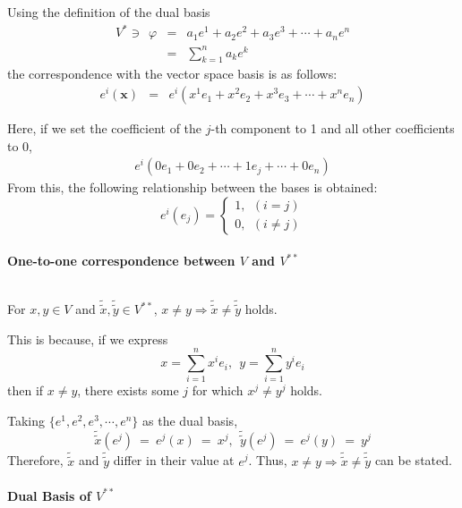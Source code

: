 \documentclass[uplatex,a4j,12pt,dvipdfmx]{jsarticle}
\begin{document}
Using the definition of the dual basis
\[
	\begin{array}{rcl}
		V^{*} \ni \ \ \varphi
		 & = &
		a_{1} e^{1} + a_{2} e^{2} + a_{3} e^{3} + \cdots + a_{n} e^{n}
		\\
		 & = &
		\displaystyle \sum_{k=1}^{n} a_{k} e^{k}
	\end{array}
\]
the correspondence with the vector space basis is as follows:
\[
	\begin{array}{rcl}
		e^{i}(\mathbf{x})
		 & = &
		e^{i} (x^{1} e_{1} + x^{2} e_{2} + x^{3} e_{3} + \cdots + x^{n} e_{n})
	\end{array}
\]

Here, if we set the coefficient of the $j$-th component to 1 and all other coefficients to 0,
\[
	\begin{array}{rcl}
		e^{i} (0 e_{1} + 0 e_{2}  + \cdots + 1 e_{j} + \cdots + 0 e_{n})
	\end{array}
\]
From this, the following relationship between the bases is obtained:
\[
	e^{i}(e_{j})
	=
	\left\{
	\begin{array}{l}
		1, \ \ (i=j) \\
		0, \ \ (i \neq j)
	\end{array}
	\right.
\]

\paragraph{One-to-one correspondence between $V$ and $V^{**}$}

${}$

For $x,y \in V$ and $\tilde{\tilde{x}}, \tilde{\tilde{y}} \in V^{**}$,
$x \neq y \Rightarrow \tilde{\tilde{x}} \neq \tilde{\tilde{y}}$ holds.

This is because,
if we express
$$
	x = \sum_{i=1}^{n} x^{i} e_{i} , \ \
	y = \sum_{i=1}^{n} y^{i} e_{i}
$$
then if $x \neq y$, there exists some $j$ for which
$x^{j} \neq y^{j}$ holds.

Taking
$\{ e^{1}, e^{2}, e^{3}, \cdots , e^{n} \}$
as the dual basis,
$$
	\tilde{\tilde{x}}(e^{j})
	\ = \
	e^{j}(x)
	\ = \
	x^{j}
	, \ \
	\tilde{\tilde{y}}(e^{j})
	\ = \
	e^{j}(y)
	\ = \
	y^{j}
$$
Therefore,
$\tilde{\tilde{x}}$ and $\tilde{\tilde{y}}$ differ in their value at $e^{j}$.
Thus,
$x \neq y \Rightarrow \tilde{\tilde{x}} \neq \tilde{\tilde{y}}$
can be stated.

\paragraph{Dual Basis of $V^{**}$}
\end{document}
